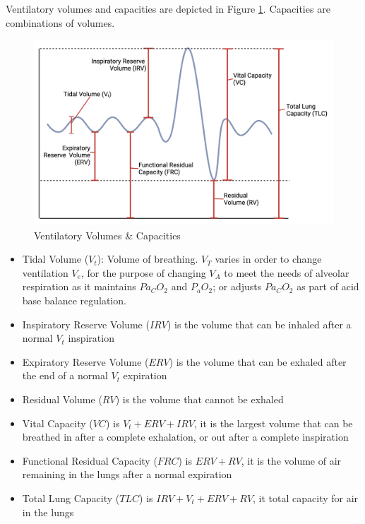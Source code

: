 Ventilatory volumes and capacities are depicted in Figure \ref{fig:ventilation_volumes}. Capacities are combinations of volumes.

\begin{figure}[!h]
    \centering
    \includegraphics[width=1.0 \linewidth]{./figure/ventilation/ventilation_volumes.png}
    \caption{Ventilatory Volumes \& Capacities}
    \label{fig:ventilation_volumes}
\end{figure}

\begin{itemize}
    \item Tidal Volume ($V_t$): Volume of breathing. $V_T$ varies in order to change ventilation $V_e$, for the purpose of changing $V_A$ to meet the needs of alveolar respiration as it maintains $Pa_CO_2$ and $P_aO_2$; or adjusts $Pa_CO_2$ as part of acid base balance regulation.
    \item Inspiratory Reserve Volume ($IRV$) is the volume that can be inhaled after a normal $V_t$ inspiration
    \item Expiratory Reserve Volume ($ERV$) is the volume that can be exhaled after the end of a normal $V_t$ expiration
    \item Residual Volume ($RV$) is the volume that cannot be exhaled
    \item Vital Capacity ($VC$) is $V_t + ERV + IRV$, it is the largest volume that can be breathed in after a complete exhalation, or out after a complete inspiration
    \item Functional Residual Capacity ($FRC$) is $ERV + RV$, it is the volume of air remaining in the lungs after a normal expiration
    \item Total Lung Capacity ($TLC$) is $IRV + V_t + ERV + RV$, it total capacity for air in the lungs
\end{itemize}

